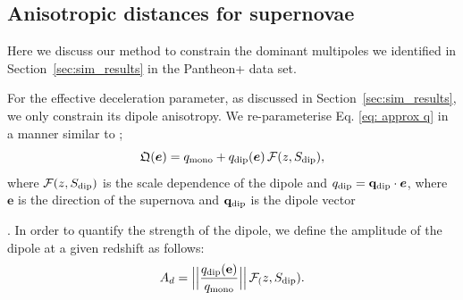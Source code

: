 \documentclass[fleqn,usenatbib]{mnras}
\begin{document}
{%
\subsection{Anisotropic distances for supernovae}
\label{sec:theory_sn}


{Here we discuss our method to constrain the dominant multipoles we identified} %
in Section~\ref{sec:sim_results} %
in the Pantheon+ data set.

{For the effective deceleration parameter, as discussed in Section~\ref{sec:sim_results}, we only constrain its dipole anisotropy.}
We re-parameterise Eq. \eqref{eq: approx q} in a manner similar to ;
\begin{equation}\label{eq:q_dip}
     \mathfrak{Q}(\boldsymbol{e}) = q_{\rm mono} + q_{\rm dip}(\boldsymbol{e}) \,\mathcal{F}(z,S_{\rm dip}),     
\end{equation}
where $\mathcal{F}(z,S_{\rm dip})$ is the scale dependence of the dipole and 
$q_{\rm dip}=\bf{q_{\rm dip}}\cdot \boldsymbol{e}$, where $\boldsymbol{e}$ 
is the direction of the supernova {and ${\bf q_{\rm dip}}$ is the dipole vector}}. In order to quantify the strength of the dipole, we define the amplitude of the dipole at a given redshift as follows:
\begin{equation}
    A_d = \Big|\Big| \frac{ q_{\rm dip}({\bf e})}{q_{\rm mono}} \Big{|\Big|} \,\mathcal{F}_(z,S_{\rm dip}) .\\
    \label{eq:dipamp}
\end{equation}
\end{document}
